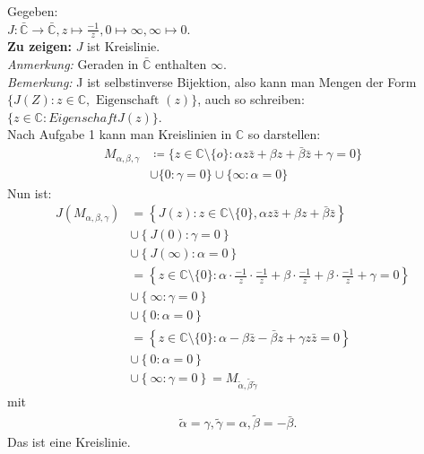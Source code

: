 \begin{problem*}[2a]
Gegeben:\\
$J: \bar{\mathbb{C}} \to \bar{\mathbb{C}}, z \mapsto \frac{-1}{z}, 0 \mapsto \infty, \infty \mapsto 0 $.\\
\textbf{Zu zeigen:} $ J $ ist Kreislinie.\\
\emph{Anmerkung:} Geraden in  $ \bar{\mathbb{C}} $ enthalten $ \infty $.\\
\emph{Bemerkung:} J ist selbstinverse Bijektion, also kann man Mengen der Form $\{ J(Z) : z \in \mathbb{C}, \text{ Eigenschaft } (z) \}$, auch so schreiben:\\
$\{ z \in \mathbb{C} : Eigenschaft J(z) \}$.\\
Nach Aufgabe 1 kann man Kreislinien in $\mathbb{C}$ so darstellen:\\
\begin{align*}
M_{ \alpha, \beta, \gamma } &\coloneqq \{ z \in \mathbb{C} \setminus \{ o \} : \alpha z \bar{z} + \beta z + \bar{\beta} \bar{z} + \gamma = 0 \} \\
&\cup \{ 0 : \gamma = 0 \} \cup \{ \infty : \alpha = 0 \}
\end{align*}
Nun ist:
\begin{align*}
J(M_{ \alpha, \beta, \gamma }) &= \left\{ J(z) : z \in \mathbb{C} \setminus \{ 0 \}, \alpha z \bar{z} + \beta z + \bar{\beta} \bar{z} \right\} \\
&\cup \left\{ J(0) : \gamma = 0 \right\} \\
&\cup \left\{ J(\infty) : \alpha = 0 \right\} \\
&= \left\{ z \in \mathbb{C} \setminus \{ 0 \} : \alpha \cdot \frac{-1}{z} \cdot \frac{-1}{z} + \beta \cdot \frac{-1}{z} + \beta \cdot \frac{-1}{z} + \gamma = 0 \right\}\\
&\cup \left\{ \infty : \gamma = 0 \right\} \\
&\cup \left\{ 0 : \alpha = 0 \right\} \\
&= \left\{ z \in \mathbb{C} \setminus\{ 0 \} : \alpha - \beta \bar{z} - \bar{\beta}z + \gamma z \bar{z} = 0 \right\} \\
&\cup \left\{ 0 : \alpha = 0 \right\} \\
&\cup \left\{ \infty : \gamma = 0 \right\} = M_{ \tilde{\alpha}, \tilde{\beta} \tilde{\gamma} }
\end{align*}
mit
\begin{align*}
&\tilde{\alpha} = \gamma, \tilde{\gamma} = \alpha, \tilde{ \beta } = - \bar{\beta}.
\end{align*}
Das ist eine Kreislinie.
\end{problem*}	
